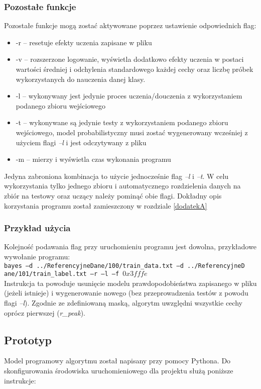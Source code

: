 \subsubsection{Pozostałe funkcje}

Pozostałe funkcje mogą zostać aktywowane poprzez ustawienie odpowiednich flag:
\begin{itemize}
\item{-r -- resetuje efekty uczenia zapisane w pliku}
\item{-v -- rozszerzone logowanie, wyświetla dodatkowo efekty uczenia w postaci wartości średniej i odchylenia standardowego każdej cechy oraz liczbę próbek wykorzystanych do nauczenia danej klasy.}
\item{-l -- wykonywany jest jedynie proces uczenia/douczenia z wykorzystaniem podanego zbioru wejściowego}
\item{-t -- wykonywane są jedynie testy z wykorzystaniem podanego zbioru wejściowego, model probabilistyczny musi zostać wygenerowany wcześniej z użyciem flagi \textit{--l} i jest odczytywany z pliku} 
\item{-m -- mierzy i wyświetla czas wykonania programu}
\end{itemize}

Jedyna zabroniona kombinacja to użycie jednocześnie flag \textit{--l} i \textit{--t}. W celu wykorzystania tylko jednego zbioru i automatycznego rozdzielenia danych na zbiór na testowy oraz uczący należy pominąć obie flagi. Dokładny opis korzystania programu został zamieszczony w rozdziale \ref{dodatekA}

\subsubsection{Przykład użycia}
Kolejność podawania flag przy uruchomieniu programu jest dowolna, przykładowe wywołanie programu:\\ 
\texttt{bayes --d ../ReferencyjneDane/100/train\_data.txt --d ../ReferencyjneD\\ane/101/train\_label.txt --r --l --f $0x3fffe$}\\ 
Instrukcja ta powoduje usunięcie modelu prawdopodobieństwa zapisanego w pliku (jeżeli istnieje) i wygenerowanie nowego (bez przeprowadzenia testów z powodu flagi \textit{--l}). Zgodnie ze zdefiniowaną maską, algorytm uwzględni wszystkie cechy oprócz pierwszej (\textit{r\_peak}). 


\subsection{Prototyp}
\label{subsec_prototyp_instr}
Model programowy algorytmu został napisany przy pomocy Pythona. Do skonfigurowania środowiska uruchomieniowego dla projektu służą poniższe instrukcje:

